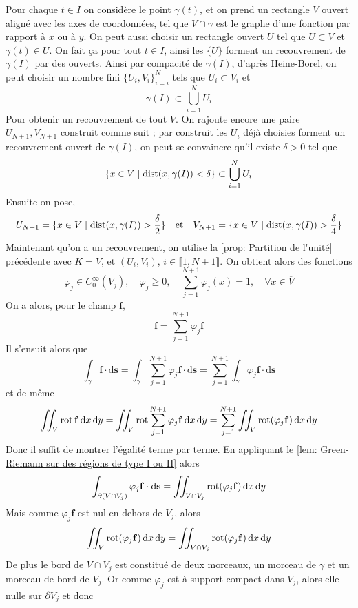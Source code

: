 {	Pour chaque $t \in I$ on considère le point $\gamma(t)$, et on prend un rectangle $V$ ouvert aligné avec les axes de coordonnées, tel que $V \cap \gamma $ est le graphe d'une fonction par rapport à $x$ ou à $y$. On peut aussi choisir un rectangle ouvert $U$ tel que $\overline U \subset V$ et $\gamma(t) \in U$. On fait ça pour tout $t \in I$, ainsi les $\{U\}$ forment un recouvrement de $\gamma(I)$ par des ouverts. Ainsi par compacité de $\gamma(I)$, d'après Heine-Borel, on peut choisir un nombre fini $\{U_i, V_i\}_{i=i}^N$ tels que $\overline U_i \subset V_i$ et 
	\[
	\gamma(I) \subset \bigcup_{i=1}^N U_i 
	\]
	Pour obtenir un recouvrement de tout $\overline V$. On rajoute encore une paire $U_{N+1}, V_{N+1}$ construit comme suit ; par construit les $U_i$ déjà choisies forment un recouvrement ouvert de $\gamma(I)$, on peut se convaincre qu'il existe $\delta > 0$ tel que
	\[
	\{ x \in V \mid \operatorname{dist}(x, \gamma(I)) < \delta \} \subset \bigcup_{i=1}^N U_i
	\]
	Ensuite on pose,
	\[
	U_{N+1} = \{x \in V \mid \operatorname{dist}(x, \gamma(I)) > \frac\delta2\} \quad \text{et} \quad V_{N+1} = \{x \in V \mid \operatorname{dist}(x, \gamma(I)) > \frac\delta4\}
	\]
	Maintenant qu'on a un recouvrement, on utilise la \autoref{prop: Partition de l'unité} précédente avec $K = \overline V$, et $(U_i, V_i)$, $i \in \llbracket 1, N+1 \rrbracket$. On obtient alors des fonctions
	\[
	\varphi_j \in C^\infty_0 (V_j), \quad \varphi_j \geqslant 0, \quad \sum_{j=1}^{N+1} \varphi_j(x) = 1,\quad \forall x \in \overline V
	\]
	On a alors, pour le champ $\bm f$,
	\[
	\bm f = \sum_{j=1}^{N+1} \varphi_j \bm f
	\]
	Il s'ensuit alors que 
	\[
	\int_\gamma \bm f \cdot \mathrm d \bm s = \int_\gamma \sum_{j=1}^{N+1} \varphi_j \bm f \cdot \mathrm d \bm s = \sum_{j=1}^{N+1} \int_\gamma \varphi_j \bm f \cdot \mathrm d \bm s
	\]
	et de même
	\[
	\iint_V \operatorname{rot} \mathbf{f} \, \mathrm dx \, \mathrm dy = \iint_V \operatorname{rot} \sum_{j=1}^{N+1} \varphi_j \mathbf{f} \, \mathrm dx \, \mathrm dy = \sum_{j=1}^{N+1} \iint_V \operatorname{rot}(\varphi_j \mathbf{f}) \, \mathrm dx \, \mathrm dy
	\]
	Donc il suffit de montrer l'égalité terme par terme. En appliquant le \autoref{lem: Green-Riemann sur des régions de type I ou II} alors 
	\[
	\int_{\partial (V \cap V_j)} \varphi_j \mathbf{f} \cdot \mathrm d \mathbf{s} = \iint_{V \cap V_j} \operatorname{rot}(\varphi_j \mathbf{f}) \, \mathrm d x \, \mathrm dy 
	\]
	Mais comme $\varphi_j \bm f$ est nul en dehors de $V_j$, alors 
	\[
	\iint_V \operatorname{rot}(\varphi_j \mathbf{f}) \, \mathrm dx \, \mathrm dy = \iint_{V \cap V_j} \operatorname{rot}(\varphi_j \mathbf{f}) \, \mathrm dx \, \mathrm dy
	\]
	De plus le bord de $V \cap V_j$ est constitué de deux morceaux, un morceau de $\gamma$ et un morceau de bord de $V_j$. Or comme $\varphi_j$ est à support compact dans $V_j$, alors elle nulle sur $\partial V_j$ et donc
}
